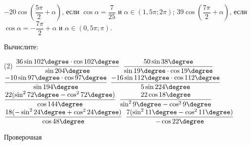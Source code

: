 \begin{class}[number=4]
\begin{listofex}
\begin{tasks}
			\task \( -20 \cos \left( \dfrac{ 5\pi }{ 2 }+ \alpha \right) \), если \( \cos \alpha = \dfrac{ 7 }{ 25 } \) и \( \alpha \in (1,5\pi; 2\pi) \);
			\task \( 39 \cos \left( \dfrac{ 7\pi }{ 2 } + \alpha \right) \), если \( \cos \alpha = -\dfrac{ 7\pi }{ 2 } + \alpha \) и \( \alpha \in (0,5\pi;\pi) \).
		\end{tasks}
		\item Вычислите:
		\begin{tasks}(2)
			\task \( \dfrac{ 36 \sin 102 \degree \cdot \cos 102 \degree }{ \sin 204 \degree } \)
			\task \( \dfrac{ 50 \sin 38 \degree }{ \sin 19 \degree \cdot \cos 19 \degree } \)
			\task \( \dfrac{ -10 \sin 97 \degree \cdot \cos 97 \degree }{ \sin 194 \degree } \)
			\task \( \dfrac{ -16 \sin 112 \degree \cdot \cos 112 \degree }{ 5 \sin 224 \degree } \)
			\task \( \dfrac{22 (\sin^2 72 \degree - \cos^2 72 \degree)}{ \cos 144 \degree } \)
			\task \( \dfrac{ 22 \cos 18 \degree }{ \sin^2 9 \degree - \cos^2 9 \degree  } \)
			\task \( \dfrac{ 18(-\sin^2 24 \degree + \cos^2 24 \degree) }{ \cos 48 \degree } \)
			\task \( \dfrac{ 7(\sin^2 11 \degree - \cos^2 11 \degree) }{ -\cos 22 \degree } \)
		\end{tasks}
	\end{listofex}
\end{class}


\begin{exam}
	\begin{listofex}
		\item Проверочная
	\end{listofex}
\end{exam}
